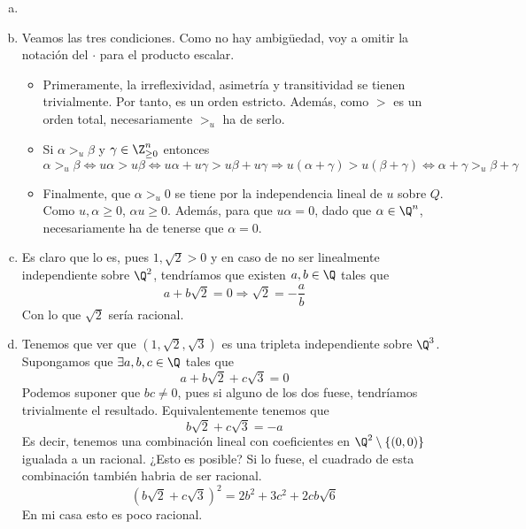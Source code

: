 \documentclass[twoside]{article}
\begin{document}
\begin{solucion}
\begin{enumerate}[a.]
\item[]
\item Veamos las tres condiciones. Como no hay ambigüedad, voy a omitir la notación del $\cdot$ para el producto escalar.
\begin{itemize}
\item Primeramente, la irreflexividad, asimetría y transitividad se tienen trivialmente. Por tanto, es un orden estricto. Además, como $>$ es un orden total, necesariamente $>_u$ ha de serlo.
\item Si $\alpha>_u \beta$ y $\gamma \in \Z^n_{\geq 0}$ entonces
$$
\alpha >_u \beta \Leftrightarrow u\alpha>u\beta\Leftrightarrow u\alpha+u\gamma >u\beta + u\gamma \Rightarrow u(\alpha+\gamma)>u(\beta+\gamma) \Leftrightarrow \alpha+\gamma >_u \beta + \gamma
$$
\item Finalmente, que $\alpha >_u 0$ se tiene por la independencia lineal de $u$ sobre $Q$. Como $u,\alpha \geq 0$, $\alpha u\geq 0$. Además, para que $u\alpha=0$, dado que $\alpha\in\Q^n$, necesariamente ha de tenerse que $\alpha=0$. 
\end{itemize}
\item Es claro que lo es, pues $1,\sqrt{2}>0$ y en caso de no ser linealmente independiente sobre $\Q^2$, tendríamos que existen $a,b\in \Q$ tales que
$$
a+b\sqrt{2}=0 \Rightarrow \sqrt{2} = -\frac{a}{b}
$$
Con lo que $\sqrt{2}$ sería racional.
\item Tenemos que ver que $(1,\sqrt{2},\sqrt{3})$ es una tripleta independiente sobre $\Q^3$. Supongamos que $\exists a,b,c\in\Q$ tales que
$$
a+b\sqrt{2}+c\sqrt{3}=0 
$$
Podemos suponer que $bc\neq 0$, pues si alguno de los dos fuese, tendríamos trivialmente el resultado. Equivalentemente tenemos que
$$
b\sqrt{2}+c\sqrt{3}=-a
$$
Es decir, tenemos una combinación lineal con coeficientes en $\Q^2\setminus\{(0,0)\}$ igualada a un racional. ¿Esto es posible? Si lo fuese, el cuadrado de esta combinación también habria de ser racional.
$$
(b\sqrt{2}+c\sqrt{3})^2 =2b^2+3c^2+2cb\sqrt{6}
$$
En mi casa esto es poco racional.
\end{enumerate}
\end{solucion}

\newpage
\end{document}
